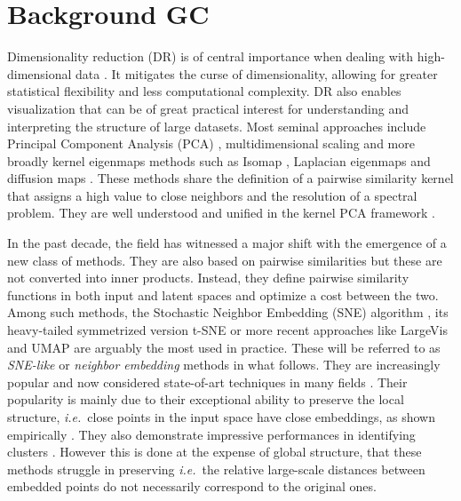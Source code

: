 \section{Background GC}

Dimensionality reduction (DR) is of central importance when dealing with high-dimensional data \citep{donoho2000high}. It mitigates the curse of dimensionality, allowing for greater statistical flexibility and less computational complexity. DR also enables visualization that can be of great practical interest for understanding and interpreting the structure of large datasets.
Most seminal approaches include Principal Component Analysis (PCA) \cite{pearson1901liii},  multidimensional scaling \cite{kruskal1978multidimensional} and more broadly kernel eigenmaps methods such as Isomap \cite{balasubramanian2002isomap}, Laplacian eigenmaps \citep{belkin2003laplacian} and diffusion maps \citep{coifman2006diffusion}. These methods share the definition of a pairwise similarity kernel that assigns a high value to close neighbors and the resolution of a spectral problem. They are well understood and unified in the kernel PCA framework \citep{ham2004kernel}.

In the past decade, the field has witnessed a major shift with the emergence of a new class of methods. They are also based on pairwise similarities but these are not converted into inner products. Instead, they define pairwise similarity functions in both input and latent spaces and optimize a cost between the two. Among such methods, the Stochastic Neighbor Embedding (SNE) algorithm \cite{NIPS2002SNE}, its heavy-tailed symmetrized version t-SNE \cite{maaten2008tSNE} or more recent approaches like LargeVis \cite{tang2016visualizing} and UMAP \cite{mcinnes2018umap} are arguably the most used in practice. These will be referred to as \textit{SNE-like} or \textit{neighbor embedding} methods in what follows. They are increasingly popular and now considered state-of-art techniques in many fields \cite{li2017application,kobak2019art,anders2018dissecting}. Their popularity is mainly due to their exceptional ability to preserve the local structure, \textit{i.e.}\ close points in the input space have close embeddings, as shown empirically \cite{wang2021understanding}. They also demonstrate impressive performances in identifying clusters \cite{arora2018analysis, linderman2019clustering}. However this is done at the expense of global structure, that these methods struggle in preserving \cite{wattenberg2016use, coenen2019understanding} \textit{i.e.}\ the relative large-scale distances between embedded points do not necessarily correspond to the original ones. 